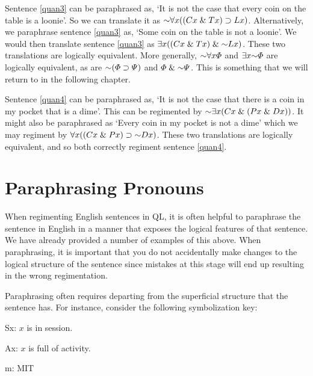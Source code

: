 Sentence \ref{quan3} can be paraphrased as, `It is not the case that every coin on the table is a loonie'.
So we can translate it as $\enot \qt{\forall}{x}((Cx \eand Tx) \eif Lx)$.
Alternatively, we paraphrase sentence \ref{quan3} as, `Some coin on the table is not a loonie'.
We would then translate sentence \ref{quan3} as $\qt{\exists}{x}((Cx \eand Tx) \eand \enot Lx)$.
These two translations are logically equivalent.
More generally, $\enot\qt{\forall}{x}\metaA{}$ and $\qt{\exists}{x}\enot\metaA{}$ are logically equivalent, as are $\enot(\metaA{}\eif\metaB{})$ and $\metaA{}\eand\enot\metaB{}$.
This is something that we will return to in the following chapter.

Sentence \ref{quan4} can be paraphrased as, `It is not the case that there is a coin in my pocket that is a dime'.
This can be regimented by $\enot\qt{\exists}{x}(Cx \eand (Px \eand Dx))$.
It might also be paraphrased as `Every coin in my pocket is not a dime' which we may regiment by $\qt{\forall}{x}((Cx \eand Px) \eif \enot Dx)$.
These two translations are logically equivalent, and so both correctly regiment sentence \ref{quan4}.






\section{Paraphrasing Pronouns}

When regimenting English sentences in QL, it is often helpful to paraphrase the sentence in English in a manner that exposes the logical features of that sentence.
We have already provided a number of examples of this above.
When paraphrasing, it is important that you do not accidentally make changes to the logical structure of the sentence since mistakes at this stage will end up resulting in the wrong regimentation.

Paraphrasing often requires departing from the superficial structure that the sentence has.
For instance, consider the following symbolization key:

\begin{ekey}
  \item[Sx:] $x$ is in session.
  \item[Ax:] $x$ is full of activity.
  \item[m:] MIT
\end{ekey}

